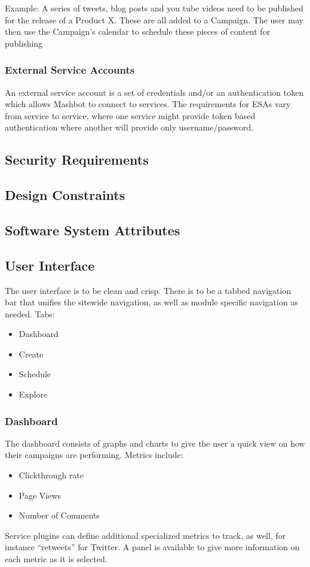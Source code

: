 \documentclass{article}
\begin{document}
                Example: A series of tweets, blog posts and you tube videos need to be published for the release of a Product X.  These are all added to a Campaign.  The user may then use the Campaign's calendar to schedule these pieces of content for publishing
		\subsubsection{External Service Accounts} %
                An external service account is a set of credentials and/or an authentication token which allows Mashbot to connect to services.  The requirements for ESAs vary from service to service, where one service might provide token based authentication where another will provide only username/password.
	\subsection{Security Requirements} %
	\subsection{Design Constraints} %
	\subsection{Software System Attributes} %
	\subsection{User Interface} %
        The user interface is to be clean and crisp. There is to be a tabbed navigation bar that unifies the sitewide navigation, as well as module specific navigation as needed.
        Tabs:
        \begin{itemize}
        \item Dashboard
        \item Create
        \item Schedule
        \item Explore
        \end{itemize}
        \subsubsection{Dashboard}
        The dashboard consists of graphs and charts to give the user a quick view on how their campaigns are performing.
        Metrics include:
        \begin{itemize}
        \item Clickthrough rate
        \item Page Views
        \item Number of Comments
        \end{itemize}
        Service plugins can define additional specialized metrics to track, as well, for instance ``retweets'' for Twitter.
        A panel is available to give more information on each metric as it is selected.
\end{document}
